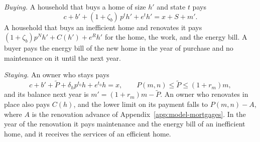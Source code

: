 \emph{Buying.} A household that buys a home of size $h'$ and state $t$
pays
\begin{equation*}
  c+b'+(1+\zeta_b)\,p^th'+e^th'=x+S+m'.
\end{equation*}
A household that buys an inefficient home and renovates it pays
$(1+\zeta_b)p^Nh'+C(h')+e^Rh'$ for the home, the work, and the energy bill.
A buyer pays the energy bill of the new home in the year of purchase and no
maintenance on it until the next year.

\emph{Staying.} An owner who stays pays
\begin{equation*}
  c+b'+\tilde P+\delta_hp^{t_0}h+e^{t_0}h=x,
  \qquad
  P(m,n)\leq\tilde P\leq(1+r_m)m,
\end{equation*}
and its balance next year is $m'=(1+r_m)m-\tilde P$. An owner who
renovates in place also pays $C(h)$, and the lower limit on its payment
falls to $P(m,n)-A$, where $A$ is the renovation advance of
Appendix~\ref{app:model-mortgages}.
In the year of the renovation it pays maintenance and the energy bill of
an inefficient home, and it receives the services of an efficient home.

